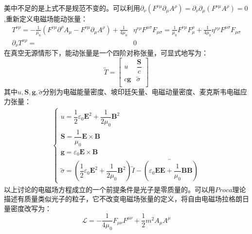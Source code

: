 \documentclass[12pt, a4paper, oneside]{ctexart}
\begin{document}
	\quad\quad 美中不足的是上式不是规范不变的。可以利用$\partial_{\nu}\left(F^{\nu\mu}\partial_{\mu}A^{\rho}\right)=\partial_{\nu}\partial_{\mu}\left(F^{\nu\mu}A^{\rho}\right)=0$,重新定义电磁场能动张量：
	\begin{equation}
		\begin{aligned}
			T^{\nu \rho}=-\frac{1}{\mu_{0}}\left( F^{\nu \mu} \partial^{\rho} A_{\mu}-F^{\nu\mu}\partial_{\mu}A^{\rho}\right)+\frac{1}{4 \mu_{0}} &\eta^{\nu \rho} F^{\mu \sigma} F_{\mu \sigma}=\frac{1}{\mu_{0}} F^{\nu \mu} F_{\mu}^{\rho}+\frac{1}{4 \mu_{0}} \eta^{\nu \rho} F^{\mu \sigma} F_{\mu \sigma}\\
			\partial_{\nu} T^{\nu \rho}=&0
		\end{aligned}
	\end{equation}
	\quad\quad 在真空无源情形下，能动张量是一个四阶对称张量，可显式地写为：
	\[
	\renewcommand{\arraystretch}{1.3}
	\overleftrightarrow{T}  =
	\begin{bmatrix}
		u & \dfrac{\boldsymbol{S}}{c}\\
		c\boldsymbol{g} & \overleftrightarrow{\sigma}\\
		
	\end{bmatrix}
	\]
	\quad\quad 其中$u,\boldsymbol{S},\boldsymbol{g},\overleftrightarrow{\sigma}$分别为电磁能量密度、坡印廷矢量、电磁动量密度、麦克斯韦电磁应力张量：
	\begin{equation}
		\begin{aligned}
			\begin{cases}
				u = \dfrac{1}{2}\varepsilon_{0}\boldsymbol{E}^{2}+\dfrac{1}{2\mu_{0}}\boldsymbol{B}^{2} \\
				\boldsymbol{S} = \dfrac{1}{\mu_{0}}\boldsymbol{E}\times\boldsymbol{B} \\
				\boldsymbol{g} = \varepsilon_{0}\boldsymbol{E}\times\boldsymbol{B} \\
				\overleftrightarrow{\sigma}= \left(\dfrac{1}{2}\varepsilon_{0}\boldsymbol{E}^{2}+\dfrac{1}{2\mu_{0}}\boldsymbol{B}^{2}\right)\overleftrightarrow{I}-\overleftrightarrow{\left(\varepsilon_{0}\boldsymbol{E}\boldsymbol{E}+\dfrac{1}{\mu_{0}}\boldsymbol{B}\boldsymbol{B}\right)}
			\end{cases}
		\end{aligned}
	\end{equation}
	\quad\quad 以上讨论的电磁场方程成立的一个前提条件是光子是零质量的。可以用$Proca$理论描述有质量类似光子的粒子，它不改变电磁场张量的定义，将自由电磁场拉格朗日量密度改写为：
	\begin{equation}
		\mathcal{L}=-\dfrac{1}{4\mu_{0}}F_{\mu\nu}F^{\mu\nu}+\dfrac{1}{2}m^{2}A_{\mu}A^{\mu}
	\end{equation}
\end{document}
